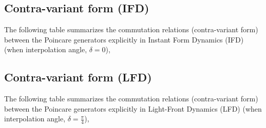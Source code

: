 \documentclass[12pt,a4paper]{report}
\begin{document}
\subsection{Contra-variant form (IFD)}
The following table summarizes the commutation
relations (contra-variant form) between the Poincare generators explicitly in Instant Form Dynamics (IFD) (when interpolation angle, $\delta=0$),
\begin{center}
\end{center}

\subsection{Contra-variant form (LFD)}
The following table summarizes the commutation
relations (contra-variant form) between the Poincare generators explicitly in Light-Front Dynamics (LFD) (when interpolation angle, $\delta=\frac{\pi}{4}$),
\end{document}
